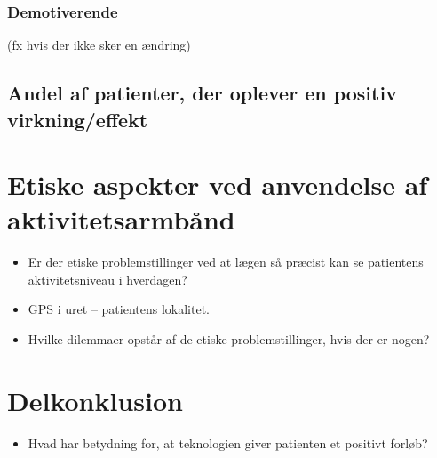 \subsubsection{Demotiverende}
(fx hvis der ikke sker en ændring)
\subsection{Andel af patienter, der oplever en positiv virkning/effekt}

\section{Etiske aspekter ved anvendelse af aktivitetsarmbånd}
\begin{itemize}
\item Er der etiske problemstillinger ved at lægen så præcist kan se patientens aktivitetsniveau i hverdagen?
\item GPS i uret – patientens lokalitet.
\item Hvilke dilemmaer opstår af de etiske problemstillinger, hvis der er nogen?
\end{itemize}

\section{Delkonklusion}
\begin{itemize}
\item Hvad har betydning for, at teknologien giver patienten et positivt forløb?
\end{itemize}

